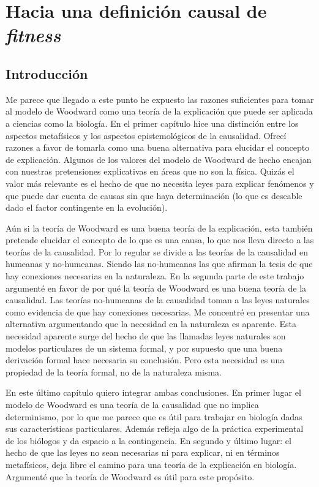 \chapter{Hacia una definición causal de \emph{fitness}}

\section{Introducción}

Me parece que llegado a este punto he expuesto las razones suficientes para tomar al modelo de  Woodward como una teoría de la explicación que puede ser aplicada a ciencias como la biología. En el primer capítulo hice una distinción entre los aspectos metafísicos y los aspectos epistemológicos de la causalidad.  Ofrecí razones a  favor de tomarla como una buena alternativa para elucidar el concepto de explicación. Algunos de los valores del modelo de Woodward de hecho encajan con nuestras pretensiones explicativas en áreas que no son la física. Quizás el valor más relevante es el hecho de que no necesita leyes para explicar fenómenos y que puede dar cuenta de causas sin que haya determinación (lo que es deseable dado el factor contingente en la evolución).

Aún si la teoría de Woodward es una buena teoría de la explicación, esta también pretende elucidar el concepto de lo que es una causa, lo que nos lleva directo a las teorías de la causalidad. Por lo regular se divide a las teorías de la causalidad en humeanas y no-humeanas. Siendo las no-humeanas las que afirman la tesis de que hay conexiones necesarias en la naturaleza. En la segunda parte de este trabajo argumenté en favor de por qué la teoría de Woodward es una buena teoría de la causalidad. Las teorías no-humeanas de la causalidad toman a las leyes naturales como evidencia de que hay conexiones necesarias. Me concentré en presentar una alternativa argumentando que la necesidad en la naturaleza es aparente. Esta necesidad aparente surge del hecho de que las llamadas leyes naturales son modelos particulares de un sistema formal, y por supuesto que una buena derivación formal hace necesaria su conclusión. Pero esta necesidad es una propiedad de la teoría formal, no de la naturaleza misma.

En este último capítulo quiero integrar ambas conclusiones. En primer lugar el modelo de Woodward es una teoría de la causalidad que no implica determinismo, por lo que me parece que es útil para trabajar en biología dadas sus características particulares. Además refleja algo de la práctica experimental de los biólogos y da espacio a la contingencia. En segundo y último lugar: el hecho de que las leyes no sean necesarias ni para explicar, ni en términos metafísicos, deja libre el camino para una teoría de la explicación en biología. Argumenté que la teoría de Woodward es útil para este propósito.


